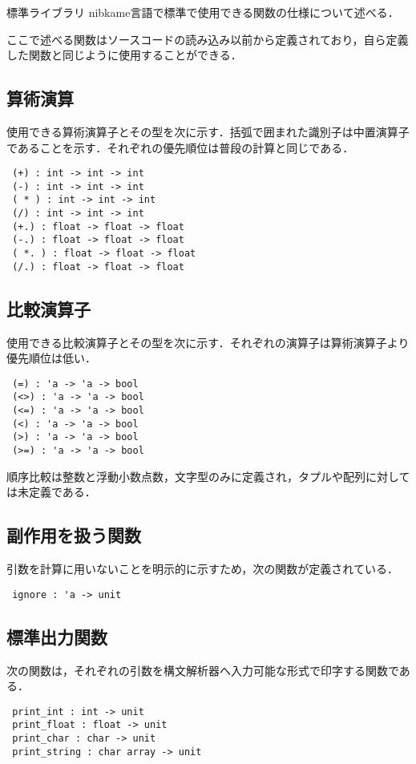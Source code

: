 \documentclass[a4paper,titlepage,report]{jsbook}
\begin{document}
\begin{resbonsiblesection}{標準ライブラリ}{\kobori}
nibkame言語で標準で使用できる関数の仕様について述べる．

ここで述べる関数はソースコードの読み込み以前から定義されており，自ら定義
した関数と同じように使用することができる．

\subsection{算術演算}
使用できる算術演算子とその型を次に示す．括弧で囲まれた識別子は中置演算子
であることを示す．それぞれの優先順位は普段の計算と同じである．
\begin{lstlisting}
 (+) : int -> int -> int
 (-) : int -> int -> int
 ( * ) : int -> int -> int
 (/) : int -> int -> int
 (+.) : float -> float -> float
 (-.) : float -> float -> float
 ( *. ) : float -> float -> float
 (/.) : float -> float -> float
\end{lstlisting}

\subsection{比較演算子}
使用できる比較演算子とその型を次に示す．それぞれの演算子は算術演算子より
優先順位は低い．
\begin{lstlisting}
 (=) : 'a -> 'a -> bool
 (<>) : 'a -> 'a -> bool
 (<=) : 'a -> 'a -> bool
 (<) : 'a -> 'a -> bool
 (>) : 'a -> 'a -> bool
 (>=) : 'a -> 'a -> bool
\end{lstlisting}
順序比較は整数と浮動小数点数，文字型のみに定義され，タプルや配列に対して
は未定義である．

\subsection{副作用を扱う関数}
引数を計算に用いないことを明示的に示すため，次の関数が定義されている．
\begin{lstlisting}
 ignore : 'a -> unit
\end{lstlisting}

\subsection{標準出力関数}
次の関数は，それぞれの引数を構文解析器へ入力可能な形式で印字する関数であ
る．
\begin{lstlisting}
 print_int : int -> unit
 print_float : float -> unit
 print_char : char -> unit
 print_string : char array -> unit
\end{lstlisting}


\end{resbonsiblesection}
\end{document}
